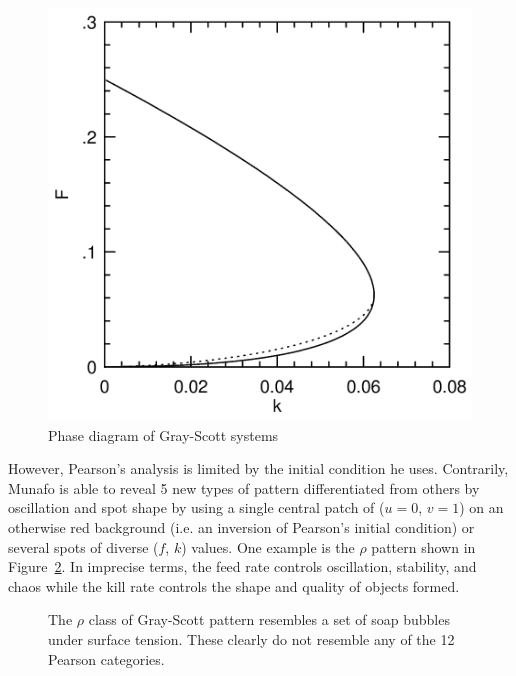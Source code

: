 \begin{figure}[!h]
\centering
\includegraphics[width=.5\textwidth]{images/pearson-threshold.png}
\caption{Phase diagram of Gray-Scott systems\cite{pearson1993complex}}
\label{fig:pearsons-threshold}
\end{figure}

However, Pearson's analysis is limited by the initial condition he uses. Contrarily, Munafo\cite{munafo2014stable} is able to reveal 5 new types of pattern differentiated from others by oscillation and spot shape by using a single central patch of ($u = 0$, $v=1$) on an otherwise red background (i.e. an inversion of Pearson's initial condition) or several spots of diverse ($f$, $k$) values. One example is the $\rho$ pattern shown in Figure~\ref{fig:munafo-rho}. In imprecise terms, the feed rate controls oscillation, stability, and chaos while the kill rate controls the shape and quality of objects formed.

\begin{figure}[H]
\centering
            \hfill
            \hfill
            \hfill
            \hfill
            \caption{The $\rho$ class of Gray-Scott pattern resembles a set of soap bubbles under surface tension. These clearly do not resemble any of the 12 Pearson categories. \cite{munafo}}
\label{fig:munafo-rho}
\end{figure}

